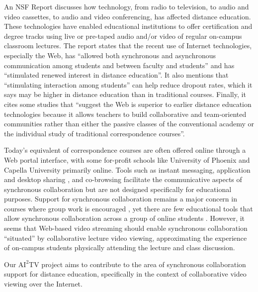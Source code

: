 \documentclass{sig-alternate}
\begin{document}

An NSF Report \cite{NSFReport} discusses how technology, from radio to
television, to audio and video cassettes, to audio and video
conferencing, has affected distance education. These technologies have
enabled educational institutions to offer certification and degree
tracks using live or pre-taped audio and/or video of regular on-campus
classroom lectures.  The report states that the recent use of Internet
technologies, especially the Web, has ``allowed both synchronous and
asynchronous communication among students and between faculty and
students'' and has ``stimulated renewed interest in distance
education''. It also mentions that ``stimulating interaction among
students'' can help reduce dropout rates, which it says may be higher
in distance education than in traditional courses. Finally, it cites
some studies that ``suggest the Web is superior to earlier distance
education technologies because it allows teachers to build
collaborative and team-oriented communities rather than either the
passive classes of the conventional academy or the individual study of
traditional correspondence courses''.

Today's equivalent of correspondence courses are often offered online
through a Web portal interface, with some for-profit schools like
University of Phoenix \cite{UPhoenix} and Capella University
\cite{Capella} primarily online.  Tools such as instant messaging,
application and desktop sharing \cite{WEBEX, VNC}, and co-browsing
\cite{CAPPS, LIEBERMAN, SIDLER} facilitate the communicative aspects
of synchronous collaboration but are not designed specifically for
educational purposes.  Support for synchronous collaboration remains a
major concern in courses where group work is encouraged \cite{WELLS},
yet there are few educational tools that allow synchronous
collaboration across a group of online students \cite{BURGESS}.
However, it seems that Web-based video streaming should enable
synchronous collaboration ``situated'' by collaborative lecture video
viewing, approximating the experience of on-campus students physically
attending the lecture and class discussion.



Our $\mathrm{AI}^2$TV project aims to contribute to the area of
synchronous collaboration support for distance education, specifically
in the context of collaborative video viewing over the Internet.
\end{document}
